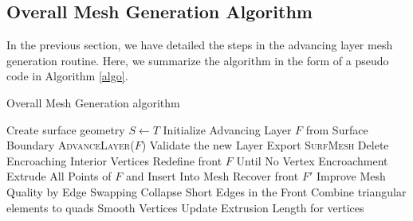 \documentclass[conf]{new-aiaa}
\begin{document}



\subsection{Overall Mesh Generation Algorithm}
In the previous section, we have detailed the steps in the advancing layer mesh generation routine. Here, we summarize the algorithm in the form of a pseudo code in Algorithm \ref{algo}.

\begin{algorithm}[hbt!]
\caption{Overall Mesh Generation algorithm}\label{alg:euclid}
\begin{algorithmic}[1]
\State Create surface geometry $S \gets T$
\State Initialize Advancing Layer $F$ from Surface Boundary
\State \textsc{AdvanceLayer($F$)}
\State Validate the new Layer
\EndWhile \label{advancing-layer-routine}
\State Export \textsc{SurfMesh}
\EndProcedure
{}
\State Delete Encroaching Interior Vertices
\State Redefine front $F$ Until No Vertex Encroachment
\State Extrude All Points of $F$ and Insert Into Mesh
\State Recover front $F'$ 
\State Improve Mesh Quality by Edge Swapping 
\State Collapse Short Edges in the Front
\State Combine triangular elements to quads
\State Smooth Vertices
\State Update Extrusion Length for vertices
\EndProcedure
\end{algorithmic}
\label{algo}
\end{algorithm}
\end{document}
